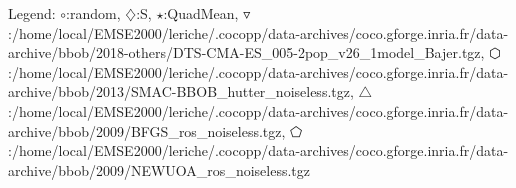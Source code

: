 Legend: {\color{NavyBlue}$\circ$}:random, {\color{Magenta}$\diamondsuit$}:S, {\color{Orange}$\star$}:QuadMean, {\color{CornflowerBlue}$\triangledown$}:/home/local/EMSE2000/leriche/.cocopp/data-archives/coco.gforge.inria.fr/data-archive/bbob/2018-others/DTS-CMA-ES\_005-2pop\_v26\_1model\_Bajer.tgz, {\color{red}$\varhexagon$}:/home/local/EMSE2000/leriche/.cocopp/data-archives/coco.gforge.inria.fr/data-archive/bbob/2013/SMAC-BBOB\_hutter\_noiseless.tgz, {\color{YellowGreen}$\triangle$}:/home/local/EMSE2000/leriche/.cocopp/data-archives/coco.gforge.inria.fr/data-archive/bbob/2009/BFGS\_ros\_noiseless.tgz, {\color{cyan}$\pentagon$}:/home/local/EMSE2000/leriche/.cocopp/data-archives/coco.gforge.inria.fr/data-archive/bbob/2009/NEWUOA\_ros\_noiseless.tgz